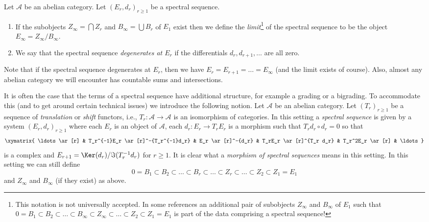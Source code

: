 \begin{definition}
\label{definition-limit-spectral-sequence}
Let $\mathcal{A}$ be an abelian category.
Let $(E_r, d_r)_{r \geq 1}$ be a spectral sequence.
\begin{enumerate}
\item If the subobjects $Z_{\infty} = \bigcap Z_r$
and $B_{\infty} = \bigcup B_r$ of $E_1$ exist then we define
the {\it limit}\footnote{This notation is not universally accepted. In some
references an additional pair of subobjects
$Z_\infty$ and $B_\infty$ of $E_1$ such that
$0 = B_1 \subset B_2 \subset \ldots \subset B_\infty \subset Z_\infty
\subset \ldots \subset Z_2 \subset Z_1 = E_1$
is part of the data comprising a spectral sequence!}
of the spectral sequence to be the object
$E_{\infty} = Z_{\infty}/B_{\infty}$.
\item We say that the spectral sequence {\it degenerates at $E_r$}
if the differentials $d_r, d_{r + 1}, \ldots$ are all zero.
\end{enumerate}
\end{definition}

\noindent
Note that if the spectral sequence degenerates at $E_r$, then
we have $E_r = E_{r + 1} = \ldots = E_{\infty}$ (and the limit
exists of course). Also, almost any abelian category we will encounter
has countable sums and intersections.

\begin{remark}[Variant]
\label{remark-allow-translation-functors}
It is often the case that the terms of a spectral sequence have
additional structure, for example a grading or a bigrading.
To accommodate this (and to get around certain technical issues)
we introduce the following notion. Let $\mathcal{A}$ be an
abelian category. Let $(T_r)_{r \geq 1}$ be a
sequence of {\it translation} or {\it shift} functors, i.e.,
$T_r : \mathcal{A} \to \mathcal{A}$ is an isomorphism of categories.
In this setting a {\it spectral sequence} is given by a system
$(E_r, d_r)_{r \geq 1}$ where each $E_r$ is an object of
$\mathcal{A}$, each $d_r : E_r \to T_rE_r$
is a morphism such that $T_rd_r \circ d_r = 0$ so that
$$
\xymatrix{
\ldots \ar[r] &
T_r^{-1}E_r \ar[r]^-{T_r^{-1}d_r} &
E_r \ar[r]^-{d_r} &
T_rE_r \ar[r]^{T_r d_r} &
T_r^2E_r \ar[r] & \ldots
}
$$
is a complex and $E_{r + 1} = \Ker(d_r)/\Im(T_r^{-1}d_r)$ for $r \geq 1$.
It is clear what a {\it morphism of spectral sequences}
means in this setting. In this setting we can still define
$$
0 = B_1 \subset B_2 \subset \ldots \subset B_r \subset \ldots
\subset Z_r \subset \ldots \subset Z_2 \subset Z_1 = E_1
$$
and $Z_\infty$ and $B_\infty$ (if they exist) as above.
\end{remark}











